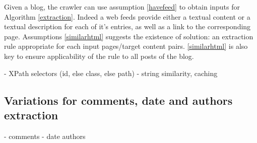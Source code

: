 Given a blog, the crawler can use assumption \ref{havefeed} to obtain inputs for Algorithm \ref{extraction}. Indeed a web feeds provide either a textual content or a textual description for each of it's entries, as well as a link to the corresponding page. Assumptions \ref{similarhtml} suggests the existence of solution: an extraction rule appropriate for each input pages/target content pairs. \ref{similarhtml} is also key to ensure applicability of the rule to all posts of the blog.

- XPath selectors (id, else class, else path)
- string similarity, caching



\subsection{Variations for comments, date and authors extraction}
- comments
- date authors
